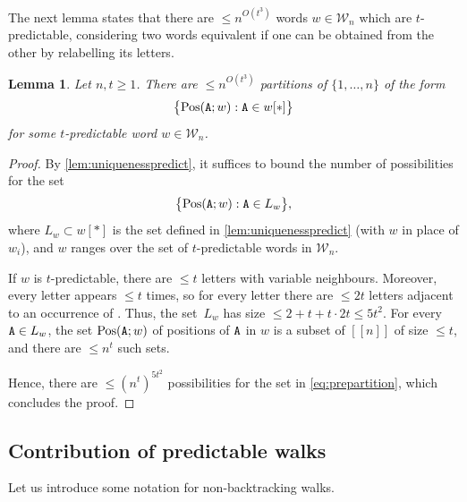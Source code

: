 \documentclass[11pt]{amsart}
\newtheorem{lemma}[theorem]{Lemma}
\theoremstyle{definition}
\renewcommand{\leq}{\leqslant}
\renewcommand{\geq}{\geqslant}
\newcommand{\sinterval}[1]{[\![#1]\!] }
\newcommand{\upletters}[1]{{\normalfont{\texttt{#1}}}}
\newcommand{\word}{\mathcal{W}}
\newcommand{\letters}[1]{#1[*]}
\newcommand{\pos}[2]{\mathrm{Pos}(#2; #1)}
\begin{document}
The next lemma states that there are $\leq n^{O(t^3)}$ words $w\in \word_n$ which are $t$-predictable, considering two words equivalent if one can be obtained from the other by relabelling its letters. 
\begin{lemma}
\label{lem:countpredict}
Let $n, t\geq 1$. There are $\leq n^{O(t^3)}$ partitions of $\{1,\ldots, n\}$ of the form 
\begin{equation*}
\big\{ \pos{w}{\upletters{A}} : \upletters{A} \in \letters{w} \big\}
\end{equation*}
for some $t$-predictable word $w\in \word_n$. 
\end{lemma}

\begin{proof}
By \cref{lem:uniquenesspredict}, it suffices to bound the number of possibilities for the set 
\begin{equation}
\label{eq:prepartition}
\big\{ \pos{w}{\upletters{A}} : \upletters{A} \in L_w \big\},
\end{equation}
where $L_w\subset \letters{w}$ is the set defined in \cref{lem:uniquenesspredict} (with $w$ in place of $w_i$), and $w$ ranges over the set of $t$-predictable words in $\word_n$. 

If $w$ is $t$-predictable, there are $\leq t$ letters with variable neighbours. Moreover, every letter appears $\leq t$ times, so for every letter \upletters{A} there are $\leq 2t$ letters adjacent to an occurrence of \upletters{A}. Thus, the set~$L_w$ has size $\leq 2+t+t\cdot 2t \leq 5t^2$. For every $\upletters{A}\in L_w$, the set $\pos{w}{\upletters{A}}$ of positions of $\upletters{A}$ in $w$ is a subset of $\sinterval{n}$ of size $\leq t$, and there are $\leq n^t$ such sets. 

Hence, there are $\leq (n^t)^{5t^2}$ possibilities for the set in \cref{eq:prepartition}, which concludes the proof.
\end{proof}

\subsection{Contribution of predictable walks}
Let us introduce some notation for non-backtracking walks.
\end{document}
